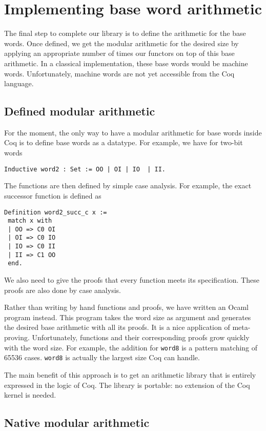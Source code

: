 \section{Implementing base word arithmetic \label{word}}

The final step to complete our library is to define the arithmetic for the 
base words. 
Once defined,  we get the modular arithmetic for the desired size by 
applying an appropriate number of times our functors on top of this base arithmetic. 
In a classical implementation, these base words would be machine words.
Unfortunately, machine words are not yet accessible from the {\sc Coq} 
language. 

\subsection{Defined modular arithmetic}

For the moment, the only way to have a modular arithmetic for base words 
inside {\sc Coq} is to define base words as a datatype. 
For example, we have for two-bit words
\begin{verbatim}
Inductive word2 : Set := OO | OI | IO  | II.
\end{verbatim}
The functions are then defined by simple case analysis. For example,
the exact successor function is defined as
\begin{verbatim}
Definition word2_succ_c x :=
 match x with
 | OO => C0 OI
 | OI => C0 IO
 | IO => C0 II
 | II => C1 OO
 end.
\end{verbatim}
We also need to give the proofs that every function meets its specification.
These proofs are also done by case analysis. 

Rather than writing by hand functions and proofs, we have
written an {\sc Ocaml} program instead.
This program takes the word size as argument and generates the 
desired base arithmetic with all its proofs. 
It is a nice application of meta-proving. Unfortunately, 
functions and their corresponding proofs grow quickly with the word size. 
For example, the addition for {\tt word8} is a pattern matching of 
65536 cases. {\tt word8} is actually the largest size {\sc Coq} can handle. 

The main benefit of  this approach is to get an arithmetic library that is 
entirely expressed in the logic of {\sc Coq}. The library is portable: 
no extension of the {\sc Coq} kernel is needed. 

\subsection{Native modular arithmetic}


